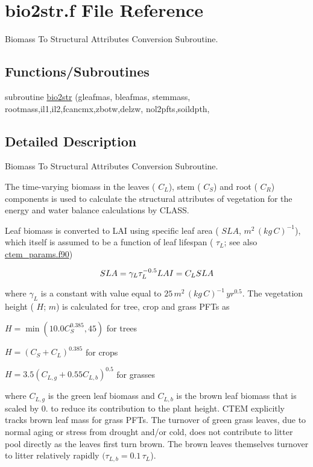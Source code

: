 \hypertarget{bio2str_8f}{}\section{bio2str.\+f File Reference}
\label{bio2str_8f}


Biomass To Structural Attributes Conversion Subroutine.  


\subsection*{Functions/\+Subroutines}
\begin{DoxyCompactItemize}
\item 
subroutine \hyperlink{bio2str_8f_a3bc457fd89cd3f3af038e068b38b5919}{bio2str} (gleafmas, bleafmas, stemmass, rootmass,il1,il2,fcancmx,zbotw,delzw, nol2pfts,soildpth,
\end{DoxyCompactItemize}


\subsection{Detailed Description}
Biomass To Structural Attributes Conversion Subroutine. 

The time-\/varying biomass in the leaves ( $C_L$), stem ( $C_S$) and root ( $C_R$) components is used to calculate the structural attributes of vegetation for the energy and water balance calculations by C\+L\+A\+S\+S.

Leaf biomass is converted to L\+A\+I using specific leaf area ( ${SLA}$, $m^2\,(kg\,C)^{-1}$), which itself is assumed to be a function of leaf lifespan ( $\tau_L$; see also \hyperlink{ctem__params_8f90}{ctem\+\_\+params.\+f90})

\[ \label{sla} SLA= \gamma_L\tau_L^{-0.5}\\ LAI = C_LSLA\nonumber \]

where $\gamma_L$ is a constant with value equal to $25\,m^2\,(kg\,C)^{-1}\,yr^{0.5}$. The vegetation height ( $H$; $m$) is calculated for tree, crop and grass P\+F\+Ts as

$ H = \min (10.0C_S^{0.385},45) $ for trees

$ H = (C_S + C_L)^{0.385} $ for crops

$ H = 3.5 (C_{L,g} + 0.55C_{L,b})^{0.5} $ for grasses

where $C_{L,g}$ is the green leaf biomass and $C_{L,b}$ is the brown leaf biomass that is scaled by 0. to reduce its contribution to the plant height. C\+T\+E\+M explicitly tracks brown leaf mass for grass P\+F\+Ts. The turnover of green grass leaves, due to normal aging or stress from drought and/or cold, does not contribute to litter pool directly as the leaves first turn brown. The brown leaves themselves turnover to litter relatively rapidly $(\tau_{L,b} = 0.1\,\tau_L$).

